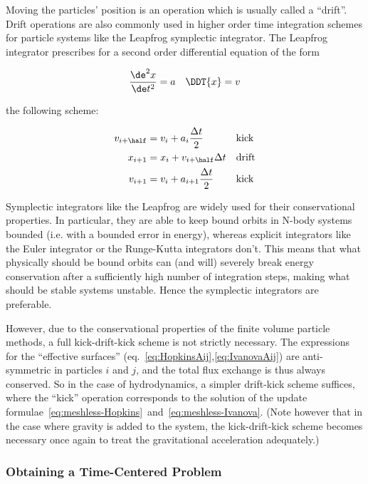 Moving the particles' position is an operation which is usually called a ``drift''. Drift
operations are also commonly used in higher order time integration schemes for particle systems
like the Leapfrog symplectic integrator. The Leapfrog integrator prescribes for a second order
differential equation of the form

\begin{align}
    \frac{\de ^2 x}{\de t ^2} = a && \DDT{x} = v
\end{align}

the following scheme:

\begin{align}
    v_{i+\half} &= v_i + a_i \frac{\Delta t}{2}  && \text{kick} \\
    x_{i+1} &= x_i + v_{i+\half} \Delta t  && \text{drift} \\
    v_{i+1} &= v_i + a_{i+1} \frac{\Delta t}{2}  && \text{kick}
\end{align}

Symplectic integrators like the Leapfrog are widely used for their conservational properties. In
particular, they are able to keep bound orbits in N-body systems bounded (i.e.  with a bounded
error in energy), whereas explicit integrators like the Euler integrator or the Runge-Kutta
integrators don't. This means that what physically should be bound orbits can (and will) severely
break energy conservation after a sufficiently high number of integration steps, making what should
be stable systems unstable. Hence the symplectic integrators are preferable.

However, due to the conservational properties of the finite volume particle methods, a full
kick-drift-kick scheme is not strictly necessary. The expressions for the ``effective surfaces''
\Aij (eq.~\ref{eq:HopkinsAij},\ref{eq:IvanovaAij}) are anti-symmetric in particles $i$ and $j$, and
the total flux exchange is thus always conserved. So in the case of hydrodynamics, a simpler
drift-kick scheme suffices, where the ``kick'' operation corresponds to the solution of the update
formulae~\ref{eq:meshless-Hopkins}~and~\ref{eq:meshless-Ivanova}. (Note however that in the case
where gravity is added to the system, the kick-drift-kick scheme becomes necessary once again to
treat the gravitational acceleration adequately.)




\subsubsection{Obtaining a Time-Centered Problem}

